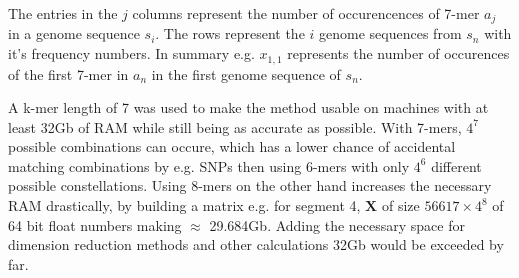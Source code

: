 The entries in the $j$ columns represent the number of occurencences of 7-mer $a_j$ in a genome sequence $s_i$. The rows represent the $i$ genome sequences from $s_n$ with it's frequency numbers. In summary e.g. $x_{1,1}$ represents the number of occurences of the first 7-mer in $a_n$ in the first genome sequence of $s_n$.

A k-mer length of 7 was used to make the method usable on machines with at least 32Gb of RAM while still being as accurate as possible. With 7-mers, $4^7$ possible combinations can occure, which has a lower chance of accidental matching combinations by e.g. \glspl{SNP} then using 6-mers with only $4^6$ different possible constellations. Using 8-mers on the other hand increases the necessary RAM drastically, by building a matrix e.g. for segment 4, $\mathbf{X}$ of size $56617 \times 4^8$ of 64 bit float numbers making $\approx$ 29.684Gb. Adding the necessary space for dimension reduction methods and other calculations 32Gb would be exceeded by far. 